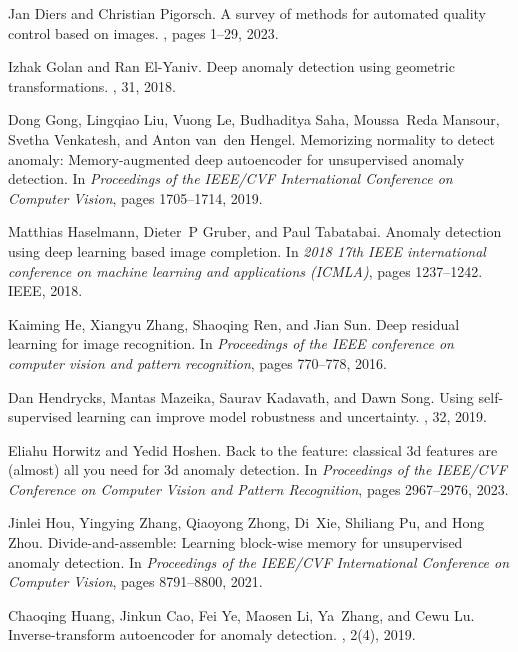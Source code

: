 \documentclass[5p, twocolumn]{elsarticle}[draft]
\begin{document}
\begin{thebibliography}{10}
Jan Diers and Christian Pigorsch.
\newblock A survey of methods for automated quality control based on images.
, pages 1--29, 2023.

Izhak Golan and Ran El-Yaniv.
\newblock Deep anomaly detection using geometric transformations.
, 31, 2018.

Dong Gong, Lingqiao Liu, Vuong Le, Budhaditya Saha, Moussa~Reda Mansour, Svetha Venkatesh, and Anton van~den Hengel.
\newblock Memorizing normality to detect anomaly: Memory-augmented deep autoencoder for unsupervised anomaly detection.
\newblock In {\em Proceedings of the IEEE/CVF International Conference on Computer Vision}, pages 1705--1714, 2019.

Matthias Haselmann, Dieter~P Gruber, and Paul Tabatabai.
\newblock Anomaly detection using deep learning based image completion.
\newblock In {\em 2018 17th IEEE international conference on machine learning and applications (ICMLA)}, pages 1237--1242. IEEE, 2018.

Kaiming He, Xiangyu Zhang, Shaoqing Ren, and Jian Sun.
\newblock Deep residual learning for image recognition.
\newblock In {\em Proceedings of the IEEE conference on computer vision and pattern recognition}, pages 770--778, 2016.

Dan Hendrycks, Mantas Mazeika, Saurav Kadavath, and Dawn Song.
\newblock Using self-supervised learning can improve model robustness and uncertainty.
, 32, 2019.

Eliahu Horwitz and Yedid Hoshen.
\newblock Back to the feature: classical 3d features are (almost) all you need for 3d anomaly detection.
\newblock In {\em Proceedings of the IEEE/CVF Conference on Computer Vision and Pattern Recognition}, pages 2967--2976, 2023.

Jinlei Hou, Yingying Zhang, Qiaoyong Zhong, Di~Xie, Shiliang Pu, and Hong Zhou.
\newblock Divide-and-assemble: Learning block-wise memory for unsupervised anomaly detection.
\newblock In {\em Proceedings of the IEEE/CVF International Conference on Computer Vision}, pages 8791--8800, 2021.

Chaoqing Huang, Jinkun Cao, Fei Ye, Maosen Li, Ya~Zhang, and Cewu Lu.
\newblock Inverse-transform autoencoder for anomaly detection.
, 2(4), 2019.


\end{thebibliography}
\end{document}
